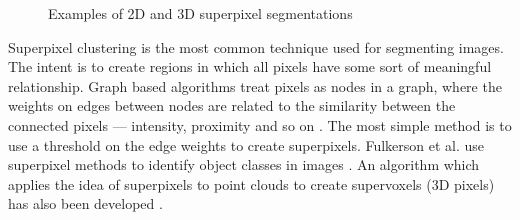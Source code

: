 \documentclass[11pt,a4paper]{kth-mag}
\begin{document}
\begin{figure}
  \centerline{
  }
    \caption{Examples of 2D and 3D superpixel segmentations}
    \label{fig:meanshift}
\end{figure}

Superpixel clustering is the most common technique used for segmenting images.
The intent is to create regions in which all pixels have some sort of meaningful
relationship. Graph based algorithms treat pixels as nodes in a graph, where the
weights on edges between nodes are related to the similarity between the
connected pixels --- intensity, proximity and so on \cite{achanta2012slic}. The
most simple method is to use a threshold on the edge weights to create
superpixels. Fulkerson et al. use superpixel methods to identify object classes
in images \cite{fulkerson2009class}. An algorithm which applies the idea of
superpixels to point clouds to create supervoxels (3D pixels) has also been
developed \cite{papon2013voxel}.
\end{document}

